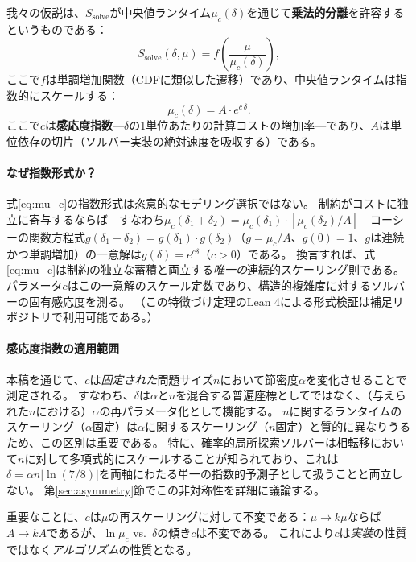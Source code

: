 \documentclass[11pt,a4paper]{article}
\newcommand{\mc}{\mu_c}
\newcommand{\Ssolve}{S_{\text{solve}}}
\begin{document}
我々の仮説は、$\Ssolve$が中央値ランタイム$\mc(\delta)$を通じて\textbf{乗法的分離}を許容するというものである：
\begin{equation}
\label{eq:separation}
\Ssolve(\delta, \mu) = f\!\left(\frac{\mu}{\mc(\delta)}\right),
\end{equation}
ここで$f$は単調増加関数（CDFに類似した遷移）であり、中央値ランタイムは指数的にスケールする：
\begin{equation}
\label{eq:mu_c}
\mc(\delta) = A \cdot e^{c\,\delta}.
\end{equation}
ここで$c$は\textbf{感応度指数}---$\delta$の1単位あたりの計算コストの増加率---であり、$A$は単位依存の切片（ソルバー実装の絶対速度を吸収する）である。

\paragraph{なぜ指数形式か？}
式\eqref{eq:mu_c}の指数形式は恣意的なモデリング選択ではない。
制約がコストに独立に寄与するならば---すなわち$\mc(\delta_1 + \delta_2) = \mc(\delta_1) \cdot [\mc(\delta_2)/A]$---コーシーの関数方程式$g(\delta_1 + \delta_2) = g(\delta_1) \cdot g(\delta_2)$（$g = \mc/A$、$g(0) = 1$、$g$は連続かつ単調増加）の一意解は$g(\delta) = e^{c\delta}$（$c > 0$）である\cite{Aczel1966}。
換言すれば、式\eqref{eq:mu_c}は制約の独立な蓄積と両立する\emph{唯一の}連続的スケーリング則である。
パラメータ$c$はこの一意解のスケール定数であり、構造的複雑度に対するソルバーの固有感応度を測る。
（この特徴づけ定理のLean 4による形式検証は補足リポジトリで利用可能である。）

\paragraph{感応度指数の適用範囲}
本稿を通じて、$c$は\emph{固定された}問題サイズ$n$において節密度$\alpha$を変化させることで測定される。
すなわち、$\delta$は$\alpha$と$n$を混合する普遍座標としてではなく、（与えられた$n$における）$\alpha$の再パラメータ化として機能する。
$n$に関するランタイムのスケーリング（$\alpha$固定）は$\alpha$に関するスケーリング（$n$固定）と質的に異なりうるため、この区別は重要である。
特に、確率的局所探索ソルバーは相転移において$n$に対して多項式的にスケールすることが知られており\cite{MuHoos2015}、これは$\delta = \alpha n|\!\ln(7/8)|$を両軸にわたる単一の指数的予測子として扱うことと両立しない。
第\ref{sec:asymmetry}節でこの非対称性を詳細に議論する。

重要なことに、$c$は$\mu$の再スケーリングに対して不変である：$\mu \to k\mu$ならば$A \to kA$であるが、$\ln \mc$ vs.\ $\delta$の傾き$c$は不変である。
これにより$c$は\emph{実装}の性質ではなく\emph{アルゴリズム}の性質となる。
\end{document}

